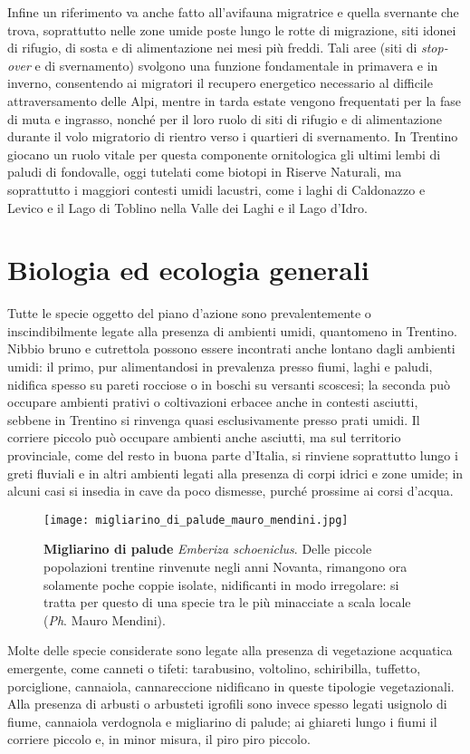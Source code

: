 \documentclass[10pt,twoside,openany,x11names,svgnames,italian,a5paper,dvipsnames,table]{memoir}
\newcommand{\ph}{\emph{Ph}. }
\begin{document}
Infine un riferimento va anche fatto all’avifauna migratrice e quella svernante che trova, soprattutto nelle zone umide poste lungo le rotte di migrazione, siti idonei di rifugio, di sosta e di alimentazione nei mesi più freddi. Tali aree (siti di \emph{stop-over} e di svernamento) svolgono una funzione fondamentale in primavera e in inverno, consentendo ai migratori il recupero energetico necessario al difficile attraversamento delle Alpi, mentre in tarda estate vengono frequentati per la fase di muta e ingrasso, nonché per il loro ruolo di siti di rifugio e di alimentazione durante il volo migratorio di rientro verso i quartieri di svernamento. In Trentino giocano un ruolo vitale per questa componente ornitologica gli ultimi lembi di paludi di fondovalle, oggi tutelati come biotopi in Riserve Naturali, ma soprattutto i maggiori contesti umidi lacustri, come i laghi di Caldonazzo e Levico e il Lago di Toblino nella Valle dei Laghi \cite{Pedrini05} \cite{Pedrini12} e il Lago d'Idro.

\section{Biologia ed ecologia generali}


Tutte le specie oggetto del piano d'azione sono prevalentemente o inscindibilmente legate alla presenza di ambienti umidi, quantomeno in Trentino. 
Nibbio bruno e cutrettola possono essere incontrati anche lontano dagli ambienti umidi: il primo, pur alimentandosi in prevalenza presso fiumi, laghi e paludi, nidifica spesso su pareti rocciose o in boschi su versanti scoscesi; la seconda può occupare ambienti prativi o coltivazioni erbacee anche in contesti asciutti, sebbene in Trentino si rinvenga quasi esclusivamente presso prati umidi. Il corriere piccolo può occupare ambienti anche asciutti, ma sul territorio provinciale, come del resto in buona parte d'Italia, si rinviene soprattutto lungo i greti fluviali e in altri ambienti legati alla presenza di corpi idrici e zone umide; in alcuni casi si insedia in cave da poco dismesse, purché prossime ai corsi d’acqua.
\begin{wrapfigure}[17]{l}{.6\textwidth}
\begin{center}
\vspace{-.7cm}
\texttt{[image: migliarino\_di\_palude\_mauro\_mendini.jpg]}
\caption*{\textbf{Migliarino di palude} \emph{Emberiza schoeniclus}. Delle piccole popolazioni trentine rinvenute negli anni Novanta, rimangono ora solamente poche coppie isolate, nidificanti in modo irregolare: si tratta per questo di una specie tra le più minacciate a scala locale (\ph Mauro Mendini).}
\end{center}
\end{wrapfigure}
Molte delle specie considerate sono legate alla presenza di vegetazione acquatica emergente, come canneti o tifeti: tarabusino, voltolino, schiribilla, tuffetto, porciglione, cannaiola, cannareccione nidificano in queste tipologie vegetazionali. Alla presenza di arbusti o arbusteti igrofili sono invece spesso legati usignolo di fiume, cannaiola verdognola e migliarino di palude; ai ghiareti lungo i fiumi il corriere piccolo e, in minor misura, il piro piro piccolo.
\end{document}
